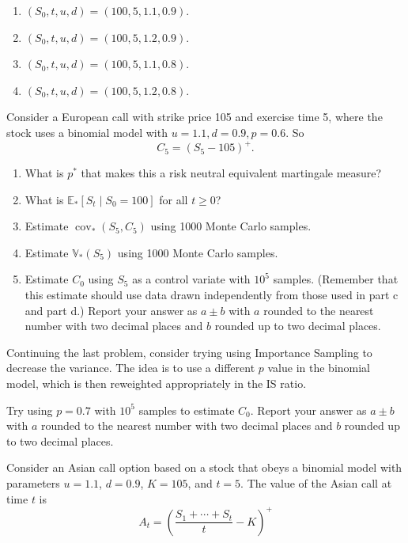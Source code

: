 \documentclass[
]{article}
\begin{document}
\begin{enumerate}
\def\labelenumi{\alph{enumi}.}
\item
  \((S_0, t, u, d) = (100, 5, 1.1, 0.9)\).
\item
  \((S_0, t, u, d) = (100, 5, 1.2, 0.9)\).
\item
  \((S_0, t, u, d) = (100, 5, 1.1, 0.8)\).
\item
  \((S_0, t, u, d) = (100, 5, 1.2, 0.8)\).
\end{enumerate}

Consider a European call with strike price 105 and exercise time 5,
where the stock uses a binomial model with
\(u = 1.1, d = 0.9, p = 0.6\). So \[
C_5 = (S_5 - 105)^+.
\]

\begin{enumerate}
\def\labelenumi{\alph{enumi}.}
\item
  What is \(p^*\) that makes this a risk neutral equivalent martingale
  measure?
\item
  What is \(\mathbb{E}_*[S_t \mid S_0 = 100]\) for all \(t \geq 0\)?
\item
  Estimate \(\operatorname{cov}_*(S_5, C_5)\) using 1000 Monte Carlo
  samples.
\item
  Estimate \(\mathbb{V}_*(S_5)\) using 1000 Monte Carlo samples.
\item
  Estimate \(C_0\) using \(S_5\) as a control variate with \(10^5\)
  samples. (Remember that this estimate should use data drawn
  independently from those used in part c and part d.) Report your
  answer as \(a \pm b\) with \(a\) rounded to the nearest number with
  two decimal places and \(b\) rounded up to two decimal places.
\end{enumerate}

Continuing the last problem, consider trying using Importance Sampling
to decrease the variance. The idea is to use a different \(p\) value in
the binomial model, which is then reweighted appropriately in the IS
ratio.

Try using \(p = 0.7\) with \(10^5\) samples to estimate \(C_0\). Report
your answer as \(a \pm b\) with \(a\) rounded to the nearest number with
two decimal places and \(b\) rounded up to two decimal places.

Consider an Asian call option based on a stock that obeys a binomial
model with parameters \(u = 1.1\), \(d = 0.9\), \(K = 105\), and
\(t = 5\). The value of the Asian call at time \(t\) is \[
A_t = \left( \frac{S_1 + \cdots + S_t}{t} - K\right)^+
\]
\end{document}

